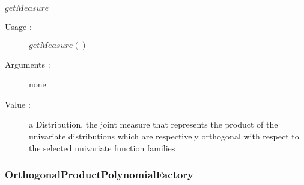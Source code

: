 \begin{description}
\begin{description}
  \item $getMeasure$
    \begin{description}
    \item[Usage :] $getMeasure()$
    \item[Arguments :] none
    \item[Value :]  a Distribution, the joint measure that represents the product of the univariate distributions which are respectively orthogonal with respect to the selected univariate function families
    \end{description}


  \end{description}

\end{description}




\newpage
\subsubsection{OrthogonalProductPolynomialFactory}




